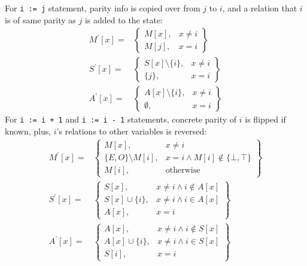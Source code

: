 For \texttt{i := j} statement, parity info is copied over from $j$ to $i$, and a relation that $i$ is of same parity as $j$ is added to the state:
\begin{align*}
M^\prime[x] = & \left.
	\begin{cases}
		M[x], & x\ne i \\
		M[j], & x = i
	\end{cases}
\right\}\\
S^\prime[x] = & \left.
	\begin{cases}
		S[x] \setminus \{i\}, & x\ne i \\
		\{j\}, & x = i
	\end{cases}
\right\}\\
A^\prime[x] = & \left.
\begin{cases}
	A[x] \setminus \{i\}, & x\ne i \\
	\emptyset, & x = i
\end{cases}
\right\}
\end{align*}
For \texttt{i := i + 1} and \texttt{i := i - 1} statements, concrete parity of $i$ is flipped if known, plus, $i$'s relations to other variables is reversed:
\begin{align*}
M^\prime[x] = & \left.
	\begin{cases}
		M[x], & x\ne i \\
		\{E, O\} \setminus M[i], & x = i \wedge M[i] \notin \{\bot, \top\} \\
		M[i], & \text{otherwise}
	\end{cases}
\right\}\\
S^\prime[x] = & \left.
	\begin{cases}
		S[x], & x\ne i \wedge i \notin A[x]\\
		S[x] \cup \{i\}, & x\ne i \wedge i \in A[x]\\
		A[x], & x = i
	\end{cases}
\right\}\\
A^\prime[x] = & \left.
	\begin{cases}
		A[x], & x\ne i \wedge i \notin S[x]\\
		A[x] \cup \{i\}, & x\ne i \wedge i \in S[x]\\
		S[i], & x = i
	\end{cases}
\right\}
\end{align*}


